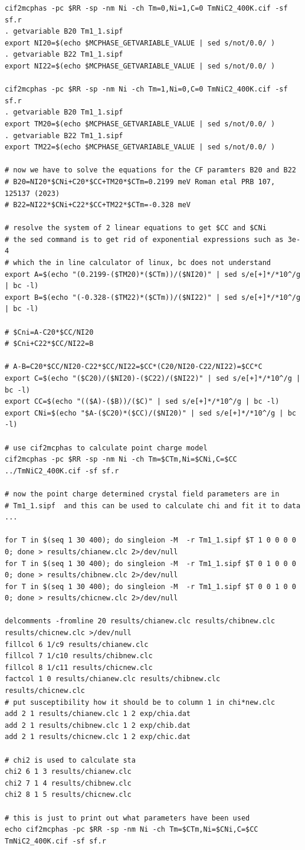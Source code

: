 \begin{verbatim}
cif2mcphas -pc $RR -sp -nm Ni -ch Tm=0,Ni=1,C=0 TmNiC2_400K.cif -sf sf.r
. getvariable B20 Tm1_1.sipf
export NI20=$(echo $MCPHASE_GETVARIABLE_VALUE | sed s/not/0.0/ )
. getvariable B22 Tm1_1.sipf
export NI22=$(echo $MCPHASE_GETVARIABLE_VALUE | sed s/not/0.0/ )

cif2mcphas -pc $RR -sp -nm Ni -ch Tm=1,Ni=0,C=0 TmNiC2_400K.cif -sf sf.r
. getvariable B20 Tm1_1.sipf
export TM20=$(echo $MCPHASE_GETVARIABLE_VALUE | sed s/not/0.0/ )
. getvariable B22 Tm1_1.sipf
export TM22=$(echo $MCPHASE_GETVARIABLE_VALUE | sed s/not/0.0/ )

# now we have to solve the equations for the CF paramters B20 and B22
# B20=NI20*$CNi+C20*$CC+TM20*$CTm=0.2199 meV Roman etal PRB 107, 125137 (2023) 
# B22=NI22*$CNi+C22*$CC+TM22*$CTm=-0.328 meV

# resolve the system of 2 linear equations to get $CC and $CNi 
# the sed command is to get rid of exponential expressions such as 3e-4
# which the in line calculator of linux, bc does not understand 
export A=$(echo "(0.2199-($TM20)*($CTm))/($NI20)" | sed s/e[+]*/*10^/g | bc -l)
export B=$(echo "(-0.328-($TM22)*($CTm))/($NI22)" | sed s/e[+]*/*10^/g | bc -l)

# $Cni=A-C20*$CC/NI20
# $Cni+C22*$CC/NI22=B

# A-B=C20*$CC/NI20-C22*$CC/NI22=$CC*(C20/NI20-C22/NI22)=$CC*C
export C=$(echo "($C20)/($NI20)-($C22)/($NI22)" | sed s/e[+]*/*10^/g | bc -l)
export CC=$(echo "(($A)-($B))/($C)" | sed s/e[+]*/*10^/g | bc -l)
export CNi=$(echo "$A-($C20)*($CC)/($NI20)" | sed s/e[+]*/*10^/g | bc -l)

# use cif2mcphas to calculate point charge model
cif2mcphas -pc $RR -sp -nm Ni -ch Tm=$CTm,Ni=$CNi,C=$CC ../TmNiC2_400K.cif -sf sf.r

# now the point charge determined crystal field parameters are in
# Tm1_1.sipf  and this can be used to calculate chi and fit it to data ...

for T in $(seq 1 30 400); do singleion -M  -r Tm1_1.sipf $T 1 0 0 0 0 0; done > results/chianew.clc 2>/dev/null
for T in $(seq 1 30 400); do singleion -M  -r Tm1_1.sipf $T 0 1 0 0 0 0; done > results/chibnew.clc 2>/dev/null
for T in $(seq 1 30 400); do singleion -M  -r Tm1_1.sipf $T 0 0 1 0 0 0; done > results/chicnew.clc 2>/dev/null

delcomments -fromline 20 results/chianew.clc results/chibnew.clc results/chicnew.clc >/dev/null
fillcol 6 1/c9 results/chianew.clc
fillcol 7 1/c10 results/chibnew.clc
fillcol 8 1/c11 results/chicnew.clc
factcol 1 0 results/chianew.clc results/chibnew.clc results/chicnew.clc
# put susceptibility how it should be to column 1 in chi*new.clc
add 2 1 results/chianew.clc 1 2 exp/chia.dat
add 2 1 results/chibnew.clc 1 2 exp/chib.dat
add 2 1 results/chicnew.clc 1 2 exp/chic.dat

# chi2 is used to calculate sta 
chi2 6 1 3 results/chianew.clc
chi2 7 1 4 results/chibnew.clc
chi2 8 1 5 results/chicnew.clc

# this is just to print out what parameters have been used
echo cif2mcphas -pc $RR -sp -nm Ni -ch Tm=$CTm,Ni=$CNi,C=$CC TmNiC2_400K.cif -sf sf.r

\end{verbatim}

